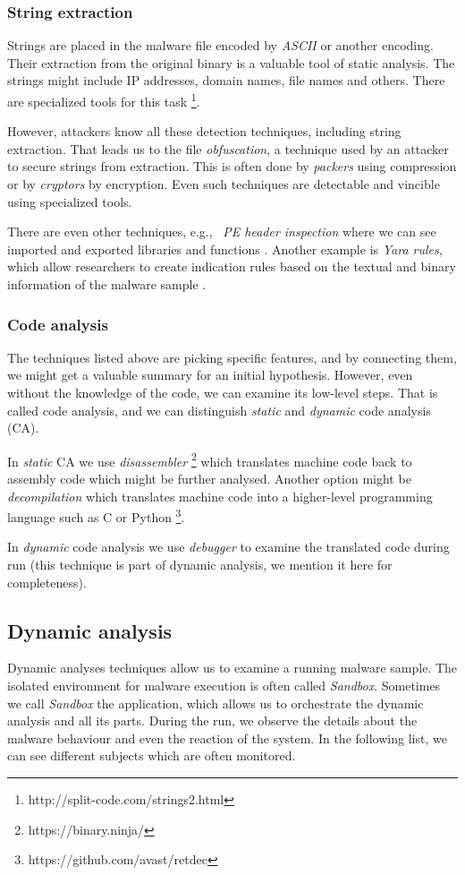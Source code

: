 \subsubsection*{String extraction}
Strings are placed in the malware file encoded by \emph{ASCII} or another encoding. Their extraction from the original binary is a valuable tool of static analysis. The strings might include IP addresses, domain names, file names and others. There are specialized tools for this task \footnote{http://split-code.com/strings2.html}. 

However, attackers know all these detection techniques, including string extraction. That leads us to the file \emph{obfuscation}, a technique used by an attacker to secure strings from extraction. This is often done by \emph{packers} using compression or by \emph{cryptors} by encryption. Even such techniques are detectable and vincible using specialized tools.

There are even other techniques, e.g., \ \emph{PE header inspection} where we can see imported and exported libraries and functions \cite{Sikorski2012}. Another example is \emph{Yara rules}, which allow researchers to create indication rules based on the textual and binary information of the malware sample \cite{KA2018}.

\subsubsection*{Code analysis}
The techniques listed above are picking specific features, and by connecting them, we might get a valuable summary for an initial hypothesis. 
However, even without the knowledge of the code, we can examine its low-level steps. That is called code analysis, and we can distinguish \emph{static} and \emph{dynamic} code analysis (CA).

In \emph{static} CA we use \emph{disassembler} \footnote{https://binary.ninja/} which translates machine code back to assembly code which might be further analysed. Another option might be \emph{decompilation} which translates machine code into a higher-level programming language such as C or Python \footnote{https://github.com/avast/retdec}.

In \emph{dynamic} code analysis we use \emph{debugger} to examine the translated code during run \cite{KA2018} (this technique is part of dynamic analysis, we mention it here for completeness).

\subsection{Dynamic analysis}
Dynamic analyses techniques allow us to examine a running malware sample. The isolated environment for malware execution is often called \emph{Sandbox}. Sometimes we call \emph{Sandbox} the application, which allows us to orchestrate the dynamic analysis and all its parts. During the run, we observe the details about the malware behaviour and even the reaction of the system. In the following list, we can see different subjects which are often monitored.

